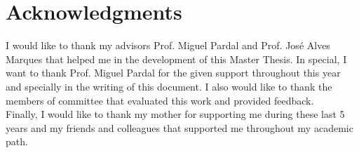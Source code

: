
\chapter*{Acknowledgments}
I would like to thank my advisors Prof. Miguel Pardal and Prof. Jos\'e Alves
Marques that helped me in the development of this Master Thesis.
In special, I want to thank Prof. Miguel Pardal for the given support
throughout this year and specially in the writing of this document. I also
would like to thank the members of committee that evaluated this work and
provided feedback.\\

Finally, I would like to thank my mother for supporting me during these last 5
years and my friends and colleagues that supported me throughout my academic
path.
